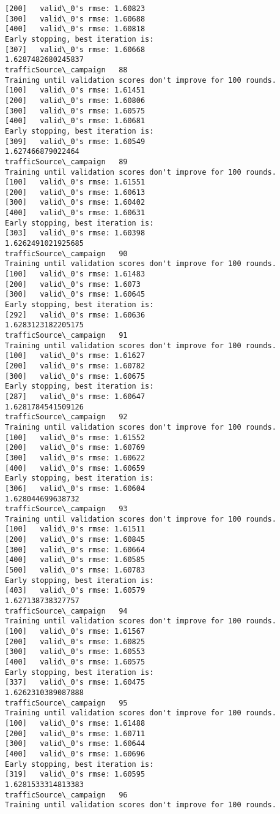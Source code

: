 \documentclass[11pt]{article}
\begin{document}
\begin{Verbatim}[commandchars=\\\{\}]
[200]	valid\_0's rmse: 1.60823
[300]	valid\_0's rmse: 1.60688
[400]	valid\_0's rmse: 1.60818
Early stopping, best iteration is:
[307]	valid\_0's rmse: 1.60668
1.6287482680245837
trafficSource\_campaign   88
Training until validation scores don't improve for 100 rounds.
[100]	valid\_0's rmse: 1.61451
[200]	valid\_0's rmse: 1.60806
[300]	valid\_0's rmse: 1.60575
[400]	valid\_0's rmse: 1.60681
Early stopping, best iteration is:
[309]	valid\_0's rmse: 1.60549
1.627466879022464
trafficSource\_campaign   89
Training until validation scores don't improve for 100 rounds.
[100]	valid\_0's rmse: 1.61551
[200]	valid\_0's rmse: 1.60613
[300]	valid\_0's rmse: 1.60402
[400]	valid\_0's rmse: 1.60631
Early stopping, best iteration is:
[303]	valid\_0's rmse: 1.60398
1.6262491021925685
trafficSource\_campaign   90
Training until validation scores don't improve for 100 rounds.
[100]	valid\_0's rmse: 1.61483
[200]	valid\_0's rmse: 1.6073
[300]	valid\_0's rmse: 1.60645
Early stopping, best iteration is:
[292]	valid\_0's rmse: 1.60636
1.6283123182205175
trafficSource\_campaign   91
Training until validation scores don't improve for 100 rounds.
[100]	valid\_0's rmse: 1.61627
[200]	valid\_0's rmse: 1.60782
[300]	valid\_0's rmse: 1.60675
Early stopping, best iteration is:
[287]	valid\_0's rmse: 1.60647
1.6281784541509126
trafficSource\_campaign   92
Training until validation scores don't improve for 100 rounds.
[100]	valid\_0's rmse: 1.61552
[200]	valid\_0's rmse: 1.60769
[300]	valid\_0's rmse: 1.60622
[400]	valid\_0's rmse: 1.60659
Early stopping, best iteration is:
[306]	valid\_0's rmse: 1.60604
1.628044699638732
trafficSource\_campaign   93
Training until validation scores don't improve for 100 rounds.
[100]	valid\_0's rmse: 1.61511
[200]	valid\_0's rmse: 1.60845
[300]	valid\_0's rmse: 1.60664
[400]	valid\_0's rmse: 1.60585
[500]	valid\_0's rmse: 1.60783
Early stopping, best iteration is:
[403]	valid\_0's rmse: 1.60579
1.627138738327757
trafficSource\_campaign   94
Training until validation scores don't improve for 100 rounds.
[100]	valid\_0's rmse: 1.61567
[200]	valid\_0's rmse: 1.60825
[300]	valid\_0's rmse: 1.60553
[400]	valid\_0's rmse: 1.60575
Early stopping, best iteration is:
[337]	valid\_0's rmse: 1.60475
1.6262310389087888
trafficSource\_campaign   95
Training until validation scores don't improve for 100 rounds.
[100]	valid\_0's rmse: 1.61488
[200]	valid\_0's rmse: 1.60711
[300]	valid\_0's rmse: 1.60644
[400]	valid\_0's rmse: 1.60696
Early stopping, best iteration is:
[319]	valid\_0's rmse: 1.60595
1.6281533314813383
trafficSource\_campaign   96
Training until validation scores don't improve for 100 rounds.

\end{Verbatim}
\end{document}
